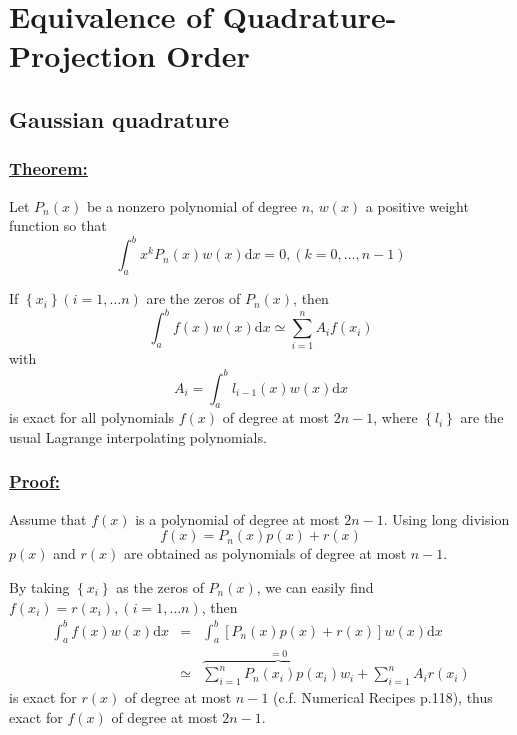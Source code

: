 
\chapter{Equivalence of Quadrature-Projection Order\label{chpt:equivalence-of-quadrature-projection-order}}


\section{Gaussian quadrature\label{sec:Gaussian-quadrature}}


\subsection*{\uline{Theorem:} }

Let $P_{n}(x)$ be a nonzero polynomial of degree $n$, $w(x)$ a
positive weight function so that
\begin{equation}
\int_{a}^{b}x^{k}P_{n}(x)w(x)\mathrm{d}x=0,(k=0,\ldots,n-1)
\end{equation}


If $\left\{ x_{i}\right\} (i=1,\ldots n)$ are the zeros of $P_{n}(x)$,
then
\begin{equation}
\int_{a}^{b}f(x)w(x)\mathrm{d}x\simeq\sum_{i=1}^{n}A_{i}f(x_{i})
\end{equation}
with
\begin{equation}
A_{i}=\int_{a}^{b}l_{i-1}(x)w(x)\mathrm{d}x
\end{equation}
is exact for all polynomials $f(x)$ of degree at most $2n-1$, where
$\left\{ l_{i}\right\} $ are the usual Lagrange interpolating polynomials.


\subsection*{\uline{Proof: }}

Assume that $f(x)$ is a polynomial of degree at most $2n-1$. Using
long division
\begin{equation}
f(x)=P_{n}(x)p(x)+r(x)
\end{equation}
$p(x)$ and $r(x)$ are obtained as polynomials of degree at most
$n-1$.

By taking $\left\{ x_{i}\right\} $ as the zeros of $P_{n}(x)$, we
can easily find $f(x_{i})=r(x_{i}),(i=1,\ldots n)$, then
\begin{eqnarray}
\int_{a}^{b}f(x)w(x)\mathrm{d}x & = & \int_{a}^{b}\left[P_{n}(x)p(x)+r(x)\right]w(x)\mathrm{d}x\nonumber \\
 & \simeq & \stackrel{=0}{\overbrace{\sum_{i=1}^{n}P_{n}(x_{i})p(x_{i})w_{i}}}+\sum_{i=1}^{n}A_{i}r(x_{i})
\end{eqnarray}
is exact for $r(x)$ of degree at most $n-1$ (c.f. Numerical Recipes
\citep{Numerical_Recipes_3ed} p.118), thus exact for $f(x)$ of degree
at most $2n-1$.



